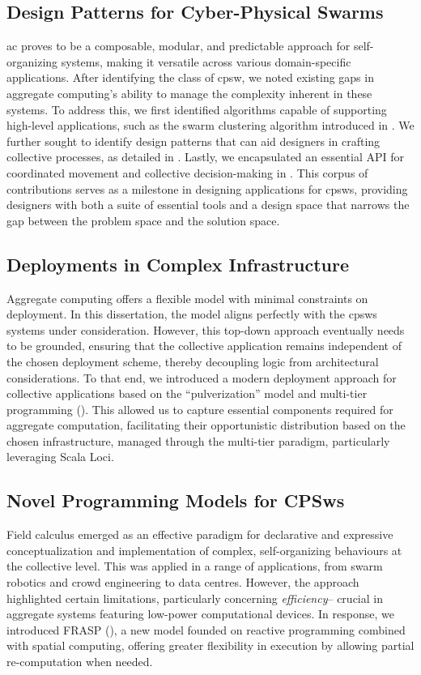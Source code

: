 \subsection*{Design Patterns for Cyber-Physical Swarms}
\sloppy
\ac{ac} proves to be a composable, 
 modular, and predictable approach for self-organizing systems, 
 making it versatile across various domain-specific applications.
% 
After identifying the class of \ac{cpsw}, 
 we noted existing gaps in aggregate computing's ability to manage the complexity inherent in these systems. 
 To address this, we first identified algorithms capable of supporting high-level applications, 
 such as the swarm clustering algorithm introduced in . 
% 
We further sought to identify design patterns that can aid designers in crafting collective processes, 
 as detailed in . 
 Lastly, we encapsulated an essential API for coordinated movement and collective decision-making in . 
%
This corpus of contributions serves as a milestone in designing applications for \acp{cpsw}, 
 providing designers with both a suite of essential tools and a design space that narrows the gap between the problem space and the solution space.
\subsection*{Deployments in Complex Infrastructure}
Aggregate computing offers a flexible model with minimal constraints on deployment. 
 In this dissertation, 
 the model aligns perfectly with the \acp{cpsw} systems under consideration. 
 However, this top-down approach eventually needs to be grounded, 
 ensuring that the collective application remains independent of the chosen deployment scheme, 
 thereby decoupling logic from architectural considerations.
%
To that end, 
 we introduced a modern deployment approach for collective applications based on the ``pulverization'' model and multi-tier programming (). 
 This allowed us to capture essential components required for aggregate computation, 
 facilitating their opportunistic distribution based on the chosen infrastructure, 
 managed through the multi-tier paradigm, 
 particularly leveraging Scala Loci.

\subsection*{Novel Programming Models for CPSws}
Field calculus emerged as an effective paradigm for declarative and expressive conceptualization and implementation of complex, 
 self-organizing behaviours at the collective level. 
% 
This was applied in a range of applications, 
 from swarm robotics and crowd engineering to data centres.
% 
However, the approach highlighted certain limitations,   particularly concerning \emph{efficiency}--
 crucial in aggregate systems featuring low-power computational devices. 
 In response, we introduced FRASP (), 
 a new model founded on reactive programming combined with spatial computing, offering greater flexibility in execution by allowing partial re-computation when needed.

